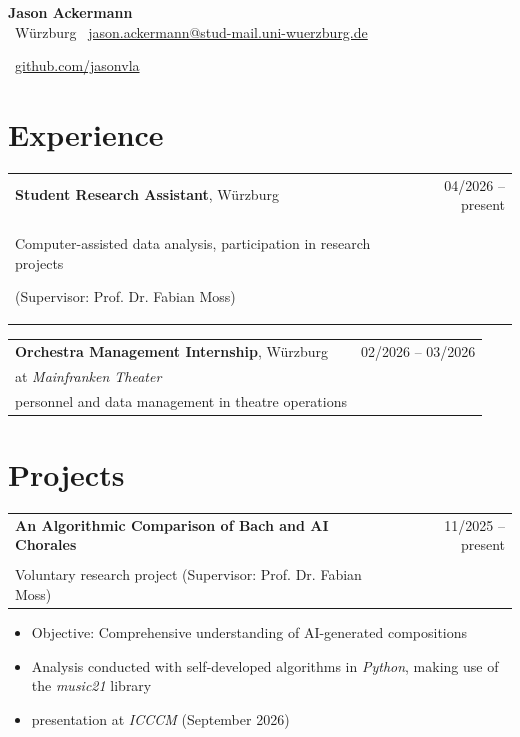 \documentclass[11pt,a4paper]{article}
\begin{document}
\begin{center}
    {\LARGE \textbf{Jason Ackermann}}\\[0.6em]

    \faMapMarker*~Würzburg
    \quad
    \faEnvelope~\href{mailto:jason.ackermann@stud-mail.uni-wuerzburg.de}{jason.ackermann@stud-mail.uni-wuerzburg.de}
    \quad

    \faGithub~\href{https://github.com/jasonvla}{github.com/jasonvla}
    \quad
\end{center}
\section{Experience}

\begin{tabularx}{\textwidth}{X r}
\textbf{Student Research Assistant}, Würzburg & 04/2026 -- present\\
Computer-assisted data analysis, participation in research projects 

(Supervisor: Prof. Dr. Fabian Moss) & \\
\end{tabularx}

\begin{tabularx}{\textwidth}{X r}
\textbf{Orchestra Management Internship}, Würzburg & 02/2026 -- 03/2026\\
at \textit{Mainfranken Theater}  \\
personnel and data management in theatre operations & \\
\end{tabularx}

\section{Projects}

\begin{tabularx}{\textwidth}{X r}
\textbf{An Algorithmic Comparison of Bach and AI Chorales} & 11/2025 -- present \\\\
Voluntary research project (Supervisor: Prof. Dr. Fabian Moss) & \\
\end{tabularx}
\begin{itemize}
    \item Objective: Comprehensive understanding of AI-generated compositions 
    \item Analysis conducted with self-developed algorithms in \textit{Python}, making use of the \textit{music21} library
    \item presentation at \textit{ICCCM} (September 2026)
\end{itemize}
\end{document}

